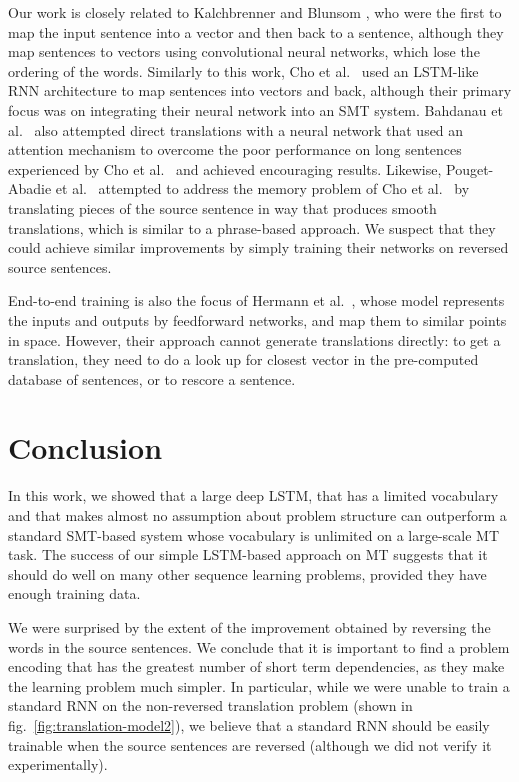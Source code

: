 \documentclass{article}
\begin{document}
Our work is closely related to Kalchbrenner and Blunsom \cite{kal13},
who were the first to map the input sentence into a vector and then
back to a sentence, although they map sentences to vectors using
convolutional neural networks, which lose the ordering of the words.
Similarly to this work, Cho et al.~\cite{cho14} used an LSTM-like RNN
architecture to map sentences into vectors and back, although their
primary focus was on integrating their neural network into an SMT
system.  Bahdanau et al.~\cite{bog14} also attempted direct
translations with a neural network that used an attention mechanism to
overcome the poor performance on long sentences experienced by Cho et
al.~\cite{cho14} and achieved encouraging results.  Likewise,
Pouget-Abadie et al.~\cite{curse} attempted to address the memory
problem of Cho et al.~\cite{cho14} by translating pieces of the source
sentence in way that produces smooth translations, which is similar to
a phrase-based approach.  We suspect that they could achieve similar
improvements by simply training their networks on reversed source
sentences.

End-to-end training is also the focus of Hermann et
al.~\cite{hermann14}, whose model represents the inputs and outputs by
feedforward networks, and map them to similar points in
space. However, their approach cannot generate translations directly:
to get a translation, they need to do a look up for closest vector in
the pre-computed database of sentences, or to rescore a sentence.

\section{Conclusion}

In this work, we showed that a large deep LSTM, that has a limited 
vocabulary and that makes almost no
assumption about problem structure can outperform a standard SMT-based system whose vocabulary
is unlimited on a large-scale MT task.  The success of our simple
LSTM-based approach on MT suggests that it should do well on many
other sequence learning problems, provided they have enough training
data.

We were surprised by the extent of the improvement obtained by
reversing the words in the source sentences.  We conclude that it is
important to find a problem encoding that has the greatest number of
short term dependencies, as they make the learning problem much
simpler.  In particular, while we were unable to train a standard
RNN on the non-reversed translation problem (shown in
fig.~\ref{fig:translation-model2}), we believe that a standard RNN
should be easily trainable when the source sentences are reversed (although we
did not verify it experimentally).
\end{document}
